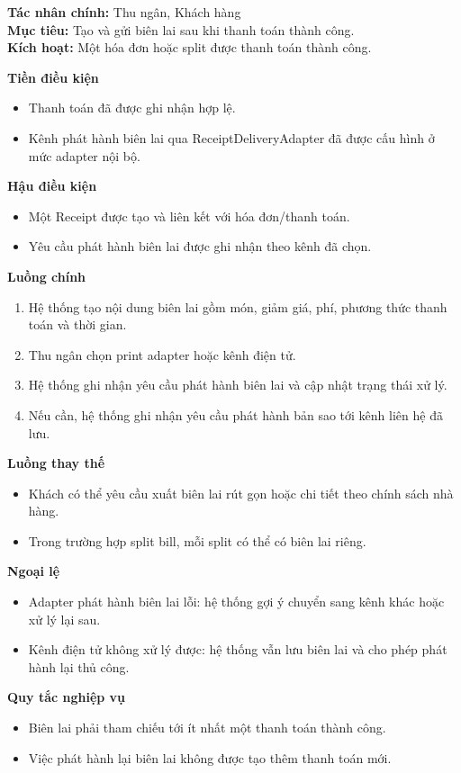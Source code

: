 \documentclass[11pt,a4paper]{article}
\begin{document}
    \begin{usecasebox}[title={UC-PAY-02 --- Phát hành biên lai}]
    \textbf{Tác nhân chính:} Thu ngân, Khách hàng\\
    \textbf{Mục tiêu:} Tạo và gửi biên lai sau khi thanh toán thành công.\\
    \textbf{Kích hoạt:} Một hóa đơn hoặc split được thanh toán thành công.

    \medskip
    \textbf{Tiền điều kiện}
    \begin{itemize}[leftmargin=1.8em]
  \item Thanh toán đã được ghi nhận hợp lệ.
  \item Kênh phát hành biên lai qua \textsf{ReceiptDeliveryAdapter} đã được cấu hình ở mức adapter nội bộ.
\end{itemize}

    \textbf{Hậu điều kiện}
    \begin{itemize}[leftmargin=1.8em]
  \item Một \textsf{Receipt} được tạo và liên kết với hóa đơn/thanh toán.
  \item Yêu cầu phát hành biên lai được ghi nhận theo kênh đã chọn.
\end{itemize}

    \textbf{Luồng chính}
    \begin{enumerate}[leftmargin=1.8em]
  \item Hệ thống tạo nội dung biên lai gồm món, giảm giá, phí, phương thức thanh toán và thời gian.
  \item Thu ngân chọn print adapter hoặc kênh điện tử.
  \item Hệ thống ghi nhận yêu cầu phát hành biên lai và cập nhật trạng thái xử lý.
  \item Nếu cần, hệ thống ghi nhận yêu cầu phát hành bản sao tới kênh liên hệ đã lưu.
\end{enumerate}

    \textbf{Luồng thay thế}
    \begin{itemize}[leftmargin=1.8em]
  \item Khách có thể yêu cầu xuất biên lai rút gọn hoặc chi tiết theo chính sách nhà hàng.
  \item Trong trường hợp split bill, mỗi split có thể có biên lai riêng.
\end{itemize}

    \textbf{Ngoại lệ}
    \begin{itemize}[leftmargin=1.8em]
  \item Adapter phát hành biên lai lỗi: hệ thống gợi ý chuyển sang kênh khác hoặc xử lý lại sau.
  \item Kênh điện tử không xử lý được: hệ thống vẫn lưu biên lai và cho phép phát hành lại thủ công.
\end{itemize}

    \textbf{Quy tắc nghiệp vụ}
    \begin{itemize}[leftmargin=1.8em]
  \item Biên lai phải tham chiếu tới ít nhất một thanh toán thành công.
  \item Việc phát hành lại biên lai không được tạo thêm thanh toán mới.
\end{itemize}
    \end{usecasebox}
\end{document}
